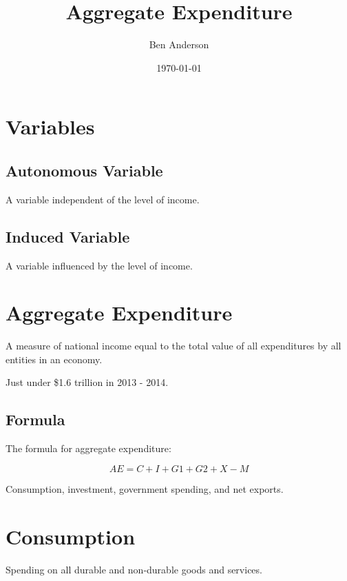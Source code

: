 \documentclass[a4paper,11pt]{article}
\begin{document}
\title{Aggregate Expenditure}
\author{Ben Anderson}
\date{\today}
\maketitle
\pagebreak

\tableofcontents
\pagebreak


\section{Variables}

\subsection{Autonomous Variable}

A variable independent of the level of income.



\subsection{Induced Variable}

A variable influenced by the level of income.





\section{Aggregate Expenditure}

A measure of national income equal to the total value of all expenditures
by all entities in an economy.

Just under \$1.6 trillion in 2013 - 2014.


\subsection{Formula}

The formula for aggregate expenditure:

$$
AE = C + I + G1 + G2 + X - M
$$

Consumption, investment, government spending, and net exports.




\section{Consumption}

Spending on all durable and non-durable goods and services.
\end{document}
